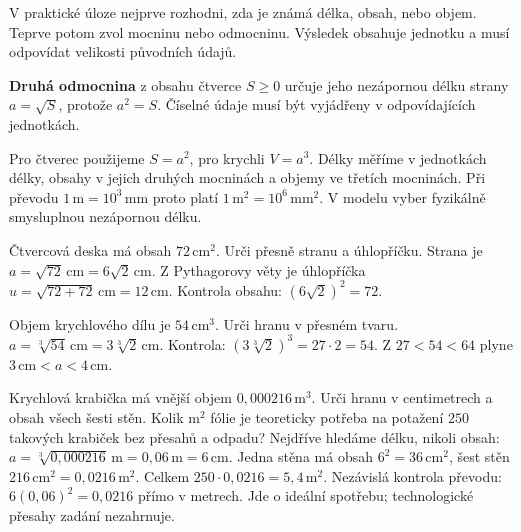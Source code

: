 \documentclass[11pt,a4paper]{article}
\begin{document}

V praktické úloze nejprve rozhodni, zda je známá délka, obsah, nebo objem. Teprve potom zvol mocninu nebo odmocninu. Výsledek obsahuje jednotku a musí odpovídat velikosti původních údajů.

\begin{definiceBox}[title={Připomenutí definice},breakable=false]
\textbf{Druhá odmocnina} z obsahu čtverce $S\ge0$ určuje jeho nezápornou délku strany $a=\sqrt S$, protože $a^2=S$. Číselné údaje musí být vyjádřeny v odpovídajících jednotkách.
\end{definiceBox}


Pro čtverec použijeme $S=a^2$, pro krychli $V=a^3$. Délky měříme v jednotkách délky, obsahy v jejich druhých mocninách a objemy ve třetích mocninách. Při převodu $1\,\mathrm m=10^3\,\mathrm{mm}$ proto platí $1\,\mathrm m^2=10^6\,\mathrm{mm}^2$. V modelu vyber fyzikálně smysluplnou nezápornou délku.


\begin{prikladReseniBox}[title={Příklad 1},breakable=false]
Čtvercová deska má obsah $72\,\mathrm{cm}^2$. Urči přesně stranu a úhlopříčku.
\tcblower
Strana je $a=\sqrt{72}\,\mathrm{cm}=6\sqrt2\,\mathrm{cm}$. Z Pythagorovy věty je úhlopříčka $u=\sqrt{72+72}\,\mathrm{cm}=12\,\mathrm{cm}$. Kontrola obsahu: $(6\sqrt2)^2=72$.
\end{prikladReseniBox}


\begin{prikladReseniBox}[title={Příklad 2},breakable=false]
Objem krychlového dílu je $54\,\mathrm{cm}^3$. Urči hranu v přesném tvaru.
\tcblower
$a=\sqrt[3]{54}\,\mathrm{cm}=3\sqrt[3]2\,\mathrm{cm}$. Kontrola: $(3\sqrt[3]2)^3=27\cdot2=54$. Z $27<54<64$ plyne $3\,\mathrm{cm}<a<4\,\mathrm{cm}$.
\end{prikladReseniBox}


\begin{prikladReseniBox}[title={Příklad 3: od objemu k množství materiálu},breakable=false]
Krychlová krabička má vnější objem $0{,}000216\,\mathrm m^3$.
Urči hranu v centimetrech a obsah všech šesti stěn.
Kolik $\mathrm m^2$ fólie je teoreticky potřeba na potažení
$250$ takových krabiček bez přesahů a odpadu?
\tcblower
Nejdříve hledáme délku, nikoli obsah:
$a=\sqrt[3]{0{,}000216}\,\mathrm m=0{,}06\,\mathrm m=6\,\mathrm{cm}$.
Jedna stěna má obsah $6^2=36\,\mathrm{cm}^2$, šest stěn
$216\,\mathrm{cm}^2=0{,}0216\,\mathrm m^2$.
Celkem $250\cdot0{,}0216=5{,}4\,\mathrm m^2$.
Nezávislá kontrola převodu: $6(0{,}06)^2=0{,}0216$ přímo v metrech.
Jde o ideální spotřebu; technologické přesahy zadání nezahrnuje.
\end{prikladReseniBox}
\end{document}
